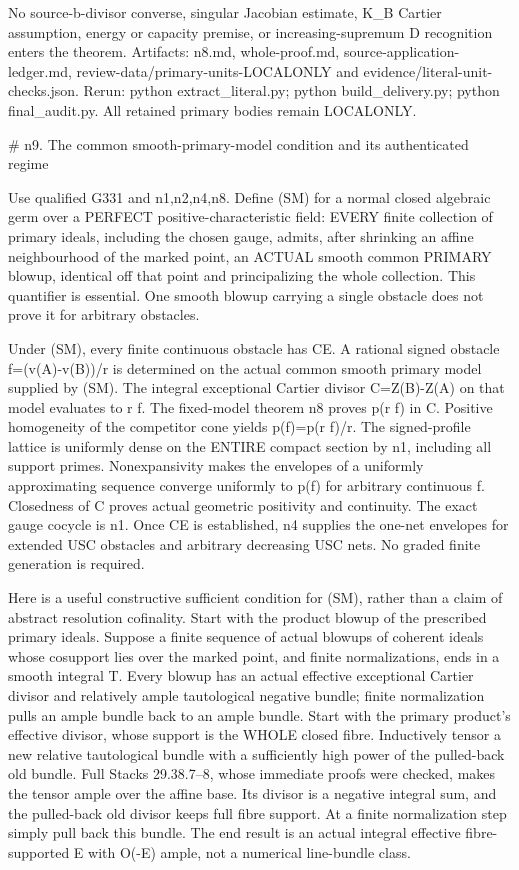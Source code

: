 \documentclass[11pt]{article}
\begin{document}
No source-b-divisor converse, singular Jacobian estimate, K\_B Cartier assumption, energy or capacity premise, or increasing-supremum D recognition enters the theorem. Artifacts: n8.md, whole-proof.md, source-application-ledger.md, review-data/primary-units-LOCALONLY and evidence/literal-unit-checks.json. Rerun: python extract\_literal.py; python build\_delivery.py; python final\_audit.py. All retained primary bodies remain LOCALONLY.

 \# n9. The common smooth-primary-model condition and its authenticated regime

Use qualified G331 and n1,n2,n4,n8. Define (SM) for a normal closed algebraic germ over a PERFECT positive-characteristic field: EVERY finite collection of primary ideals, including the chosen gauge, admits, after shrinking an affine neighbourhood of the marked point, an ACTUAL smooth common PRIMARY blowup, identical off that point and principalizing the whole collection. This quantifier is essential. One smooth blowup carrying a single obstacle does not prove it for arbitrary obstacles.

Under (SM), every finite continuous obstacle has CE. A rational signed obstacle f=(v(A)-v(B))/r is determined on the actual common smooth primary model supplied by (SM). The integral exceptional Cartier divisor C=Z(B)-Z(A) on that model evaluates to r f. The fixed-model theorem n8 proves p(r f) in C. Positive homogeneity of the competitor cone yields p(f)=p(r f)/r. The signed-profile lattice is uniformly dense on the ENTIRE compact section by n1, including all support primes. Nonexpansivity makes the envelopes of a uniformly approximating sequence converge uniformly to p(f) for arbitrary continuous f. Closedness of C proves actual geometric positivity and continuity. The exact gauge cocycle is n1. Once CE is established, n4 supplies the one-net envelopes for extended USC obstacles and arbitrary decreasing USC nets. No graded finite generation is required.

Here is a useful constructive sufficient condition for (SM), rather than a claim of abstract resolution cofinality. Start with the product blowup of the prescribed primary ideals. Suppose a finite sequence of actual blowups of coherent ideals whose cosupport lies over the marked point, and finite normalizations, ends in a smooth integral T. Every blowup has an actual effective exceptional Cartier divisor and relatively ample tautological negative bundle; finite normalization pulls an ample bundle back to an ample bundle. Start with the primary product's effective divisor, whose support is the WHOLE closed fibre. Inductively tensor a new relative tautological bundle with a sufficiently high power of the pulled-back old bundle. Full Stacks 29.38.7--8, whose immediate proofs were checked, makes the tensor ample over the affine base. Its divisor is a negative integral sum, and the pulled-back old divisor keeps full fibre support. At a finite normalization step simply pull back this bundle. The end result is an actual integral effective fibre-supported E with O(-E) ample, not a numerical line-bundle class.
\end{document}
